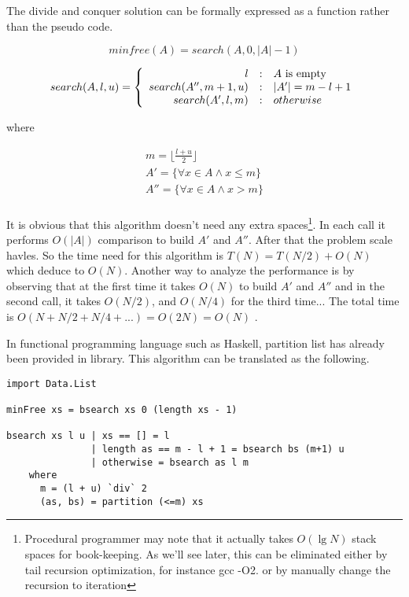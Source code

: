 \documentclass{article}
\begin{document}
The divide and conquer solution can be formally expressed
as a function rather than the pseudo code.

\[
minfree(A) = search(A, 0, |A|-1)
\]

\[
search(A, l, u) = \left \{ 
       \begin{array}
       {r@{\quad:\quad}l}
       l & A \mbox{ is empty} \\
       search(A'', m+1, u) &  |A'| = m - l + 1 \\
       search(A',  l, m) & otherwise
       \end{array}
\right.
\]

where

\[ \begin{array}{l}
m = \lfloor \frac{l+u}{2} \rfloor \\
A'  = \{ \forall x \in A \wedge x \leq m \} \\
A'' = \{ \forall x \in A \wedge x > m \} \\
\end{array} \]

It is obvious that this algorithm doesn't need any extra
spaces\footnote{Procedural programmer may note that it 
actually takes $O(\lg N)$ stack spaces for book-keeping. As
we'll see later, this can be eliminated either by tail
recursion optimization, for instance gcc -O2. or by manually
change the recursion to iteration}. In each call it
performs $O(|A|)$ comparison to build $A'$ and $A''$.
After that the problem scale havles.
So the time need for this algorithm is $T(N) = T(N/2) + O(N)$
which deduce to $O(N)$. Another way to analyze the performance
is by observing that at the first time it takes $O(N)$
to build $A'$ and $A''$ and in the second call, it takes
$O(N/2)$, and $O(N/4)$ for the third time... The total
time is $O(N + N/2 + N/4 + ...) = O(2N) = O(N)$ .

In functional programming language such as Haskell, 
partition list has already been provided in library. 
This algorithm can be translated as the following.

\lstset{language=Haskell}
\begin{lstlisting}
import Data.List

minFree xs = bsearch xs 0 (length xs - 1)

bsearch xs l u | xs == [] = l
               | length as == m - l + 1 = bsearch bs (m+1) u
               | otherwise = bsearch as l m
    where
      m = (l + u) `div` 2
      (as, bs) = partition (<=m) xs
\end{lstlisting}
\end{document}
